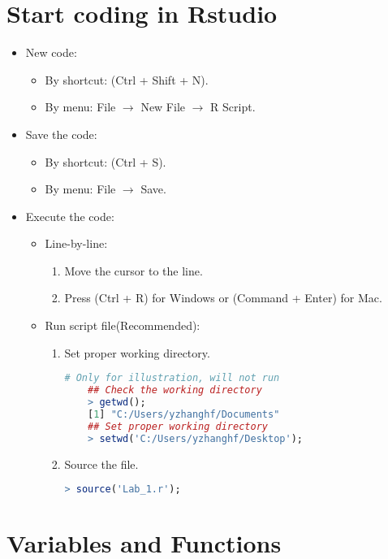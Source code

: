 \documentclass[10pt]{article}
\begin{document}
\section{Start coding in Rstudio}
\begin{itemize}
	\item New code:
	\begin{itemize}
		\item By shortcut: (Ctrl + Shift + N).
		\item By menu: File $\to$ New File $\to$ R Script.
	\end{itemize}
	\item Save the code:
	\begin{itemize}
		\item By shortcut: (Ctrl + S).
		\item By menu: File $\to$ Save.
	\end{itemize}
	\item Execute the code:
	\begin{itemize}
		\item Line-by-line:
		\begin{enumerate}
			\item Move the cursor to the line.
			\item Press (Ctrl + R) for Windows or (Command + Enter) for Mac.
		\end{enumerate}
		\item Run script file(Recommended):
		\begin{enumerate}
			\item Set proper working directory.
\begin{lstlisting}[style=displaycode, language=R]
	# Only for illustration, will not run
	## Check the working directory
	> getwd();
	[1] "C:/Users/yzhanghf/Documents"
	## Set proper working directory
	> setwd('C:/Users/yzhanghf/Desktop');
\end{lstlisting}
			\item Source the file.
\begin{lstlisting}[style=displaycode, language=R]
	> source('Lab_1.r');
\end{lstlisting}
		\end{enumerate}
	\end{itemize}
\end{itemize}

\section{Variables and Functions}
\end{document}
